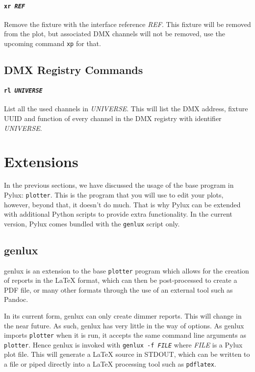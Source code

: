 \documentclass[a4paper]{article}
\begin{document}
\paragraph{\texttt{xr \textit{REF}}}
Remove the fixture with the interface reference \textit{REF}. This fixture 
will be removed from the plot, but associated DMX channels will not be 
removed, use the upcoming command \texttt{xp} for that.

\subsection{DMX Registry Commands}

\paragraph{\texttt{rl \textit{UNIVERSE}}}
List all the used channels in \textit{UNIVERSE}. This will list the DMX 
address, fixture UUID and function of every channel in the DMX registry with 
identifier \textit{UNIVERSE}.

\section{Extensions}
In the previous sections, we have discussed the usage of the base program in 
Pylux: \texttt{plotter}. This is the program that you will use to edit your
plots, however, beyond that, it doesn't do much. That is why Pylux can be 
extended with additional Python scripts to provide extra functionality. In 
the current version, Pylux comes bundled with the \texttt{genlux} script only.

\subsection{genlux}
genlux is an extension to the base \texttt{plotter} program which allows for 
the creation of reports in the \LaTeX{} format, which can then be 
post-processed to create a PDF file, or many other formats through the use of 
an external tool such as Pandoc.

In its current form, genlux can only create dimmer reports. This will change 
in the near future. As such, genlux has very little in the way of options. As 
genlux imports \texttt{plotter} when it is run, it accepts the same command 
line arguments as \texttt{plotter}. Hence genlux is invoked with 
\texttt{genlux -f \textit{FILE}} where \textit{FILE} is a Pylux plot file.
This will generate a \LaTeX{} source in STDOUT, which can be written to a 
file or piped directly into a \LaTeX{} processing tool such as 
\texttt{pdflatex}.
\end{document}
